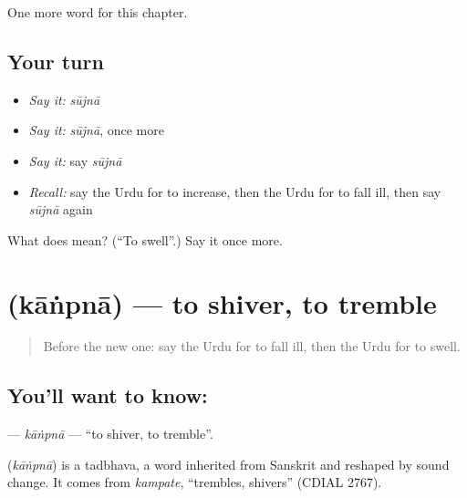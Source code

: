 \begin{grammarlens}[title={What you've built}]
One more word for this chapter.
\end{grammarlens}

\subsection*{Your turn}
\begin{itemize}
\raggedright
  \item \emph{Say it:} \emph{sūjnā}
  \item \emph{Say it:} \emph{sūjnā}, once more
  \item \emph{Say it:} say \emph{sūjnā}
  \item \emph{Recall:} say the Urdu for to increase, then the Urdu for to fall ill, then say \emph{sūjnā} again
\end{itemize}

\begin{tcolorbox}[breakable,colback=teal!4,colframe=teal!35!black,title={Before you move on}]
What does  mean? (\textquotedblleft{}To swell\textquotedblright{}.) Say it once more.
\end{tcolorbox}
\section[\texorpdfstring{\ur{کانپنا} (kāṅpnā)}{کانپنا (kāṅpnā)}]{ (kāṅpnā) — to shiver, to tremble}

\label{lesson:UR-C184-kanpna}



\begin{quote}
Before the new one: say the Urdu for to fall ill, then the Urdu for to swell.
\end{quote}

\subsection*{You'll want to know: }
\textbf{} — \emph{kāṅpnā} — \textquotedblleft{}to shiver, to tremble\textquotedblright{}.

\begin{cousinweb}
\textbf{} (\emph{kāṅpnā}) is a tadbhava, a word inherited from Sanskrit and reshaped by sound change. It comes from \emph{kampate}, \textquotedblleft{}trembles, shivers\textquotedblright{} (CDIAL 2767).
\end{cousinweb}


